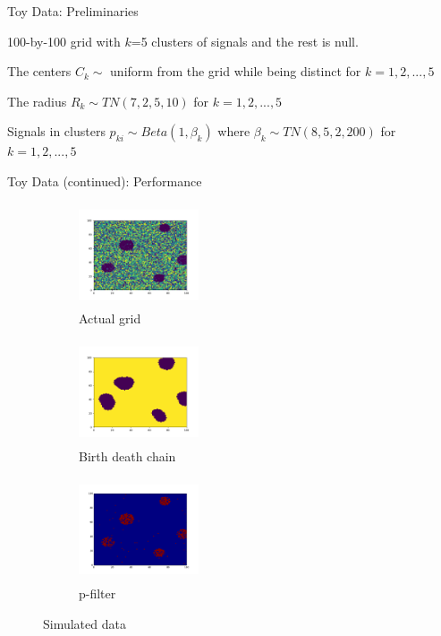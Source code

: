\documentclass[10pt,mathserif]{beamer}
\begin{document}
\begin{frame} {Toy Data: Preliminaries}
\BIT
\item 100-by-100 grid with $k$=5 clusters of signals and the rest is null.
\item The centers $C_k \sim$  uniform from the grid while being distinct for $k = 1, 2, ..., 5$
\item The radius $R_k \sim T N (7, 2, 5, 10)$ for $k = 1, 2, ..., 5$
\item Signals in clusters $p_{ki} \sim Beta(1, \beta_k)$ where $\beta_k \sim TN(8, 5, 2, 200)$ for $k = 1, 2, ..., 5$
\EIT
\end{frame}

\begin{frame} {Toy Data (continued): Performance }
\begin{figure}[t!]
    \centering
    \begin{subfigure}[t]{0.3\textwidth}
        \centering
        \includegraphics[height=1.2in, width=1.4in]{../BDC_gridactual}
        \caption{Actual grid}
    \end{subfigure}%
    \begin{subfigure}[t]{0.3\textwidth}
        \centering
        \includegraphics[height=1.2in, width=1.4in]{../BDC_grid1}
        \caption{Birth death chain}
    \end{subfigure}%
    \begin{subfigure}[t]{0.3\textwidth}
        \centering
        \includegraphics[height=1.2in, width=1.4in]{../BH_toy_data}
        \caption{p-filter}
    \end{subfigure}
    \caption{Simulated data}
\end{figure}
\end{frame}
\end{document}
